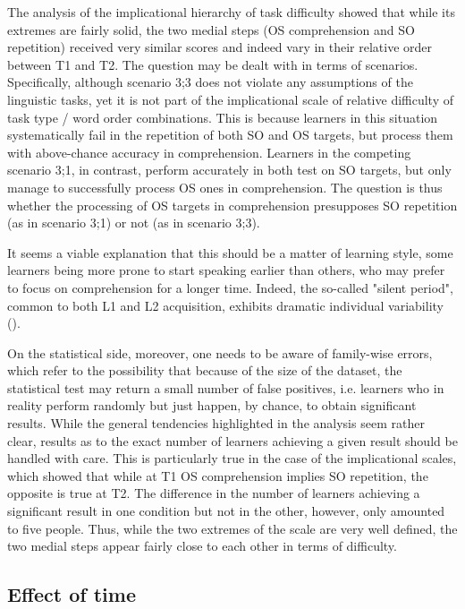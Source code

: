 The analysis of the implicational hierarchy of task difficulty showed that while its extremes are fairly solid, the two medial steps (OS comprehension and SO repetition) received very similar scores and indeed vary in their relative order between T1 and T2. The question may be dealt with in terms of scenarios. Specifically, although scenario 3;3 does not violate any assumptions of the linguistic tasks, yet it is not part of the implicational scale of relative difficulty of task type / word order combinations. This is because learners in this situation systematically fail in the repetition of both SO and OS targets, but process them with above-chance accuracy in comprehension. Learners in the competing scenario 3;1, in contrast, perform accurately in both test on SO targets, but only manage to successfully process OS ones in comprehension. The question is thus whether the processing of OS targets in comprehension presupposes SO repetition (as in scenario 3;1) or not (as in scenario 3;3).

It seems a viable explanation that this should be a matter of learning style, some learners being more prone to start speaking earlier than others, who may prefer to focus on comprehension for a longer time. Indeed, the so-called "silent period", common to both L1 and L2 acquisition, exhibits dramatic individual variability (\citealt{Krashen1985, Granger2004}).

On the statistical side, moreover, one needs to be aware of family-wise errors, which refer to the possibility that because of the size of the dataset, the statistical test may return a small number of false positives, i.e. learners who in reality perform randomly but just happen, by chance, to obtain significant results. While the general tendencies highlighted in the analysis seem rather clear, results as to the exact number of learners achieving a given result should be handled with care. This is particularly true in the case of the implicational scales, which showed that while at T1 OS comprehension implies SO repetition, the opposite is true at T2. The difference in the number of learners achieving a significant result in one condition but not in the other, however, only amounted to five people. Thus, while the two extremes of the scale are very well defined, the two medial steps appear fairly close to each other in terms of difficulty.

\subsection{Effect of time}\label{sec:08:4.4}

